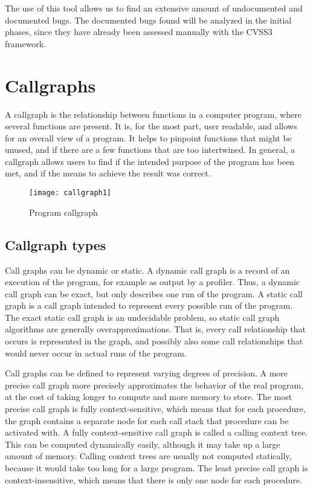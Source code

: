 The use of this tool allows us to find an extensive amount of undocumented and documented bugs. The documented bugs found will be analyzed in the initial phases, since they have already been assessed manually with the CVSS3 framework.

\section{Callgraphs}

A callgraph\parencite{dataFlow} is the relationship between functions in a computer program, where several functions are present. It is, for the most part, user readable, and allows for an overall view of a program. It helps to pinpoint functions that might be unused, and if there are a few functions that are too intertwined. In general, a callgraph allows users to find if the intended purpose of the program has been met, and if the means to achieve the result was correct.

\begin{figure}[!htb]
	\caption{Program callgraph}
	\centering
	\texttt{[image: callgraph1]}
\end{figure}

\subsection{Callgraph types}

Call graphs can be dynamic or static. A dynamic call graph is a record of an execution of the program, for example as output by a profiler. Thus, a dynamic call graph can be exact, but only describes one run of the program. A static call graph is a call graph intended to represent every possible run of the program. The exact static call graph is an undecidable problem, so static call graph algorithms are generally overapproximations. That is, every call relationship that occurs is represented in the graph, and possibly also some call relationships that would never occur in actual runs of the program.

Call graphs can be defined to represent varying degrees of precision. A more precise call graph more precisely approximates the behavior of the real program, at the cost of taking longer to compute and more memory to store. The most precise call graph is fully context-sensitive, which means that for each procedure, the graph contains a separate node for each call stack that procedure can be activated with. A fully context-sensitive call graph is called a calling context tree. This can be computed dynamically easily, although it may take up a large amount of memory. Calling context trees are usually not computed statically, because it would take too long for a large program. The least precise call graph is context-insensitive, which means that there is only one node for each procedure.



